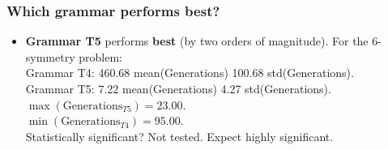 \begin{frame}
\frametitle{
Which grammar performs best?
}
\begin{itemize}
\item {\bf Grammar T5} performs {\bf best} (by two orders of magnitude).
        For the 6-symmetry problem:\\
       Grammar T4: 460.68 mean(Generations) 100.68 std(Generations).\\
       Grammar T5: 7.22 mean(Generations)     4.27 std(Generations).\\
       $\max(\mbox{Generations}_{T5})=23.00$. \\
       $\min(\mbox{Generations}_{T4})=95.00$. \\
 
Statistically significant? Not tested. Expect highly significant.
\end{itemize}
\end{frame}